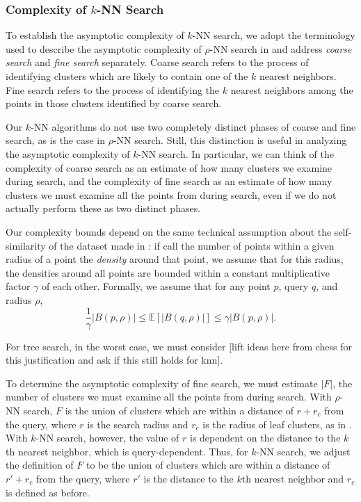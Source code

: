 \subsubsection{Complexity of $k$-NN Search}
\label{paragraph:methods:knn-complexity}



To establish the asymptotic complexity of $k$-NN search, we adopt 
the terminology used to describe the asymptotic complexity of $\rho$-NN search 
in \cite{yu2015entropy}
and address \emph{coarse search} and \emph{fine search} separately. 
Coarse search refers to the process of identifying clusters
which are likely to contain one of the $k$ nearest neighbors. Fine search refers to the process
of identifying the $k$ nearest neighbors among the points in those clusters identified by coarse search.


Our $k$-NN algorithms do not use two completely distinct phases of coarse and fine search, 
as is the case in $\rho$-NN search. Still, this distinction is useful in analyzing 
the asymptotic complexity of $k$-NN search. In particular, we can think of the complexity of 
coarse search as an estimate of how many clusters we examine during search, and 
the complexity of fine search as an estimate of how many clusters we must examine all the points 
from during search, even if we do not actually perform these as two distinct phases. 


Our complexity bounds depend on the same technical assumption about the self-similarity of the dataset made in 
\cite{yu2015entropy}: if call the number of points within a given 
radius of a point the \emph{density} around that point, we assume that for this radius, the densities around all points
are bounded within a constant multiplicative factor $\gamma$ of each other. Formally, 
we assume that for any point $p$, query $q$, and radius 
$\rho$, \begin{equation} \frac{1}{\gamma}|B(p, \rho)| \leq \mathbb{E}[|B(q, \rho)|] \leq \gamma |B(p, \rho)|. \label{3} \end{equation}

For tree search, in the worst case, we must consider [lift ideas here from chess for this justification and ask 
if this still holds for knn]. 

To determine the asymptotic complexity of fine search, we must estimate $|F|$, the 
number of clusters we must examine all the points from during search. With $\rho$-NN 
search, $F$ is the union of clusters which are within a distance of $r + r_c$ from the query,
where $r$ is the search radius and $r_c$ is the radius of leaf clusters,
as in \cite{yu2015entropy}. With $k$-NN search, however, 
the value of $r$ is dependent on the distance to the $k$th nearest neighbor, which 
is query-dependent. Thus, for $k$-NN search, we  adjust the definition of 
$F$ to be the union of clusters which are within a distance of $r' + r_c$ from the query, 
where $r'$ is the distance to the $k$th nearest neighbor and $r_c$ is defined as before.

